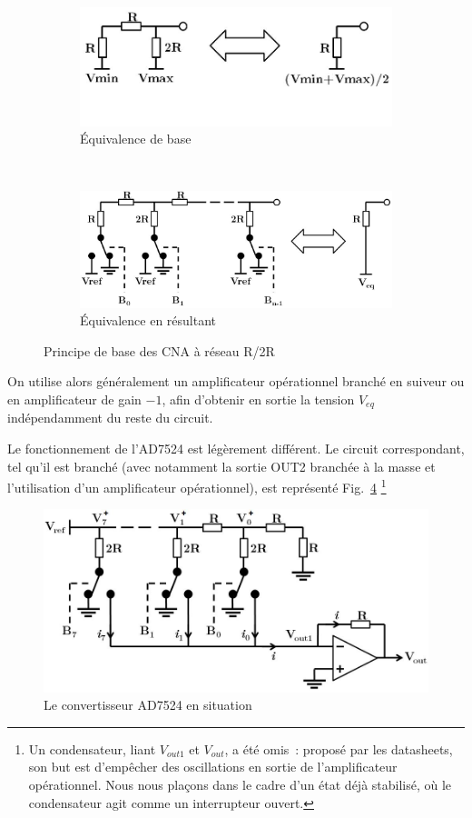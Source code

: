 \documentclass{article}
\begin{document}
\begin{figure}[h]
  \centering
  \begin{subfigure}[b]{0.43\textwidth}
    \centering
    \includegraphics[width=\textwidth]{R2Rbasics}
    \caption{Équivalence de base}
    \label{fig:R2Rbase1}
  \end{subfigure}
  ~~~~
  \begin{subfigure}[b]{0.53\textwidth}
    \centering
    \includegraphics[width=\textwidth]{R2Rexpended}
    \caption{Équivalence en résultant}
    \label{fig:R2Rbase2}
  \end{subfigure}
  \caption{Principe de base des CNA à réseau R/2R}
\end{figure}

On utilise alors généralement un amplificateur opérationnel branché en suiveur ou en amplificateur de gain $-1$, afin d'obtenir en sortie la tension $V_{eq}$ indépendamment du reste du circuit.


Le fonctionnement de l'AD7524 est légèrement différent. Le circuit correspondant, tel qu'il est branché (avec notamment la sortie OUT2 branchée à la masse et l'utilisation d'un amplificateur opérationnel), est représenté Fig.~\ref{fig:AD7524} \footnote{Un condensateur, liant $V_{out1}$ et $V_{out}$, a été omis~: proposé par les datasheets, son but est d'empêcher des oscillations en sortie de l'amplificateur opérationnel. Nous nous plaçons dans le cadre d'un état déjà stabilisé, où le condensateur agit comme un interrupteur ouvert.}

\begin{figure}[h]
  \centering
  \includegraphics[width=.6\textwidth]{AD7524}
  \caption{Le convertisseur AD7524 en situation}
  \label{fig:AD7524}
\end{figure}
\end{document}
